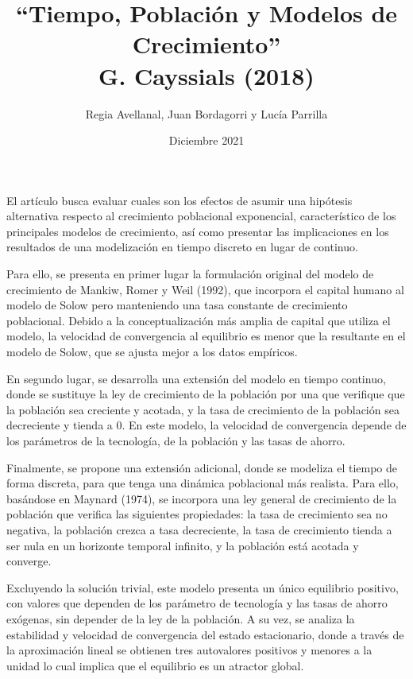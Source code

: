 \documentclass[10pt]{article}
\begin{document}
\title{“Tiempo, Población y Modelos de Crecimiento” \\ G. Cayssials (2018)}
\author{Regia Avellanal, Juan Bordagorri y Lucía Parrilla }
\date{Diciembre 2021}
\maketitle

\newpage

El artículo busca evaluar cuales son los efectos de asumir una hipótesis alternativa respecto al crecimiento poblacional exponencial, característico de los principales modelos de crecimiento, así como presentar las implicaciones en los resultados de una modelización en tiempo discreto en lugar de continuo.

Para ello, se presenta en primer lugar la formulación original del modelo de crecimiento de Mankiw, Romer y Weil (1992), que incorpora el capital humano al modelo de Solow pero manteniendo una tasa constante de crecimiento poblacional. Debido a la conceptualización más amplia de capital que utiliza el modelo, la velocidad de convergencia al equilibrio es menor que la resultante en el modelo de Solow, que se ajusta mejor a los datos empíricos.

En segundo lugar, se desarrolla una extensión del modelo en tiempo continuo, donde se sustituye la ley de crecimiento de la población por una que verifique que la población sea creciente y acotada, y la tasa de crecimiento de la población sea decreciente y tienda a 0. En este modelo, la velocidad de convergencia depende de los parámetros de la tecnología, de la población y las tasas de ahorro.

Finalmente, se propone una extensión adicional, donde se modeliza el tiempo de forma discreta, para que tenga una dinámica poblacional más realista. Para ello, basándose en Maynard (1974), se incorpora una ley general de crecimiento de la población que verifica las siguientes propiedades: la tasa de crecimiento sea no negativa, la población crezca a tasa decreciente, la tasa de crecimiento tienda a ser nula en un horizonte temporal infinito, y la población está acotada y converge.

Excluyendo la solución trivial, este modelo presenta un único equilibrio positivo, con valores que dependen de los parámetro de tecnología y las tasas de ahorro exógenas, sin depender de la ley de la población. A su vez, se analiza la estabilidad y velocidad de convergencia del estado estacionario, donde a través de la aproximación lineal se obtienen tres autovalores positivos y menores a la unidad lo cual implica que el equilibrio es un atractor global.
\end{document}
